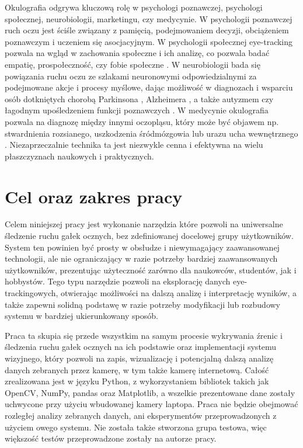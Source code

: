 \documentclass[a4paper,twoside,12pt]{book}
\begin{document}
Okulografia odgrywa kluczową rolę w psychologi poznawczej, psychologi społecznej, neurobiologii, marketingu, czy medycynie. W psychologii poznawczej ruch oczu jest ściśle związany z pamięcią, podejmowaniem decyzji, obciążeniem poznawczym i uczeniem się asocjacyjnym. W psychologii społecznej eye-tracking pozwala na wgląd w zachowania społeczne i ich analizę, co pozwala badać empatię, prospołeczność, czy fobie społeczne \cite{bib:tobii-main}. W neurobiologii bada się powiązania ruchu oczu ze szlakami neuronowymi odpowiedzialnymi za podejmowane akcje i procesy myślowe, dając możliwość w diagnozach i wsparciu osób dotkniętych chorobą Parkinsona \cite{bib:tobii-parkinson}, Alzheimera \cite{bib:tobii-alzheimer}, a także autyzmem czy łagodnym upośledzeniem funkcji poznawczych \cite{bib:tobii-autyzm}. W medycynie okulografia pozwala na diagnozę między innymi oczopląsu, który może być objawem np. stwardnienia rozsianego, uszkodzenia śródmózgowia lub urazu ucha wewnętrznego \cite{bib:Diagnostyka-oczoplas}. Niezaprzeczalnie technika ta jest niezwykle cenna i efektywna na wielu płaszczyznach naukowych i praktycznych.

\section{Cel oraz zakres pracy}
\label{sec:cel-oraz-zakres-pracy}
Celem niniejszej pracy jest wykonanie narzędzia które pozwoli na uniwersalne śledzenie ruchu gałek ocznych, bez zdefiniowanej docelowej grupy użytkowników. System ten powinien być prosty w obsłudze i niewymagający zaawansowanej technologii, ale nie ograniczający w razie potrzeby bardziej zaawansowanych użytkowników, prezentując użyteczność zarówno dla naukowców, studentów, jak i hobbystów. Tego typu narzędzie pozwoli na eksplorację danych eye-trackingowych, otwierając możliwości na dalszą analizę i interpretację wyników, a także zapewni solidną podstawę w razie potrzeby modyfikacji lub rozbudowy systemu w bardziej ukierunkowany sposób.

Praca ta skupia się przede wszystkim na samym procesie wykrywania źrenic i śledzenia ruchu gałek ocznych na ich podstawie oraz implementacji systemu wizyjnego, który pozwoli na zapis, wizualizację i potencjalną dalszą analizę danych zebranych przez kamerę, w tym także kamerę internetową. Całość zrealizowana jest w języku Python, z wykorzystaniem bibliotek takich jak OpenCV, NumPy, pandas oraz Matplotlib, a wszelkie prezentowane dane zostały uchwycone przy użyciu wbudowanej kamery laptopa. Praca nie będzie obejmować rozległej analizy zebranych danych, ani eksperymentów przeprowadzonych z użyciem owego systemu. Nie została także stworzona grupa testowa, więc większość testów przeprowadzone zostały na autorze pracy.
\end{document}
